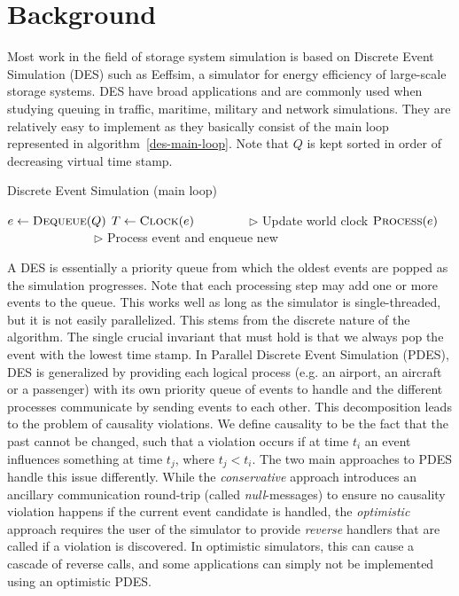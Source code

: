 \section{Background}
Most work in the field of storage system simulation is based on Discrete
Event Simulation (DES) such as Eeffsim\cite{eeffsim}, a simulator for energy
efficiency of large-scale storage systems. DES have broad applications and are
commonly used when studying queuing in traffic,
maritime, military and network simulations\cite{omnetpp}. They are relatively
easy to implement as they basically consist of the main loop represented in
algorithm~\ref{des-main-loop}. Note that $Q$ is kept sorted in order
of decreasing virtual time stamp.

\begin{algorithm}[H]
	\caption{Discrete Event Simulation (main loop)}
	\label{des-main-loop}
	\begin{algorithmic}[1] %
		\State $e \gets \Call{Dequeue}{Q}$
		\State $T \gets \Call{Clock}{e}$ ~~~~~~~~$\triangleright$ Update world clock
		\State $\Call{Process}{e}$ ~~~~~~~~~~~~~~$\triangleright$ Process event and enqueue new
		\EndWhile
		\EndProcedure
	\end{algorithmic}
\end{algorithm}

A DES is essentially a priority queue from which the oldest events are popped
as the simulation progresses. Note that each processing step may add one or
more events to the queue. This works well as
long as the simulator is single-threaded, but it is not easily parallelized.
This stems from the discrete nature of the algorithm. The single crucial
invariant that must hold is that we always pop the event with the lowest time
stamp. In Parallel Discrete Event Simulation (PDES), DES is generalized
by providing each logical process (e.g. an airport, an aircraft or a
passenger) with its own priority queue of events to handle and the different
processes communicate by sending events to each other. This decomposition leads
to the problem of causality violations. We define causality to be the fact that
the past cannot be changed, such that a violation occurs if at time $t_i$ an
event influences something at time $t_j$, where $t_j < t_i$. The two main
approaches to PDES handle this issue differently. While the \emph{conservative}
approach introduces an ancillary communication round-trip (called
\emph{null}-messages) to ensure no
causality violation happens if the current event candidate is
handled\cite{conservative-pdes-1, conservative-pdes-2}, the \emph{optimistic}
approach requires the user of the simulator to provide \emph{reverse} handlers
that are called if a violation is discovered\cite{timewarp}. In optimistic
simulators, this can cause a cascade of reverse calls, and some applications
can simply not be implemented using an optimistic PDES\cite{fujimoto-pdes}.

